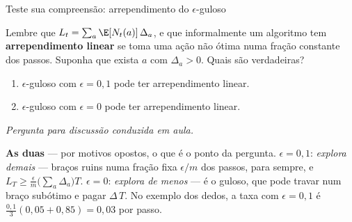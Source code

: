 \documentclass[aspectratio=169, 10pt]{beamer}
\newcommand{\paradiscussao}{\smallskip
  {\footnotesize\color{rlCinza}\itshape Pergunta para discussão conduzida em aula.}}
\newcommand{\Nc}{N}                         %
\newcommand{\gap}{\Delta}
\newcommand{\Reg}{L}
\begin{document}
\begin{frame}{Teste sua compreensão: arrependimento do $\epsilon$-guloso}
  \vspace{-2mm}
  \begin{quizbox}{}
    Lembre que $\Reg_t = \sum_{a} \E[\Nc_t(a)]\,\gap_a$, e que
    informalmente um algoritmo tem \textbf{arrependimento linear} se toma
    uma ação não ótima numa fração constante dos passos. Suponha que
    exista $a$ com $\gap_a > 0$. Quais são verdadeiras?
    \begin{enumerate}\setlength{\itemsep}{0.15ex}
      \item $\epsilon$-guloso com $\epsilon = 0{,}1$ pode ter
            arrependimento linear.
      \item $\epsilon$-guloso com $\epsilon = 0$ pode ter arrependimento
            linear.
    \end{enumerate}
    \paradiscussao
  \end{quizbox}

  \pause

  \begin{respbox}
    \textbf{As duas} --- por motivos opostos, o que é o ponto da pergunta.
    $\epsilon = 0{,}1$: \emph{explora demais} — braços ruins numa fração
    fixa $\epsilon/m$ dos passos, para sempre, e
    $\Reg_T \ge \frac{\epsilon}{m}\bigl(\sum_a \gap_a\bigr) T$.
    $\epsilon = 0$: \emph{explora de menos} — é o guloso, que pode travar
    num braço subótimo e pagar $\gap\,T$. No exemplo dos dedos, a taxa com
    $\epsilon = 0{,}1$ é $\frac{0{,}1}{3}(0{,}05 + 0{,}85) = 0{,}03$ por
    passo.
  \end{respbox}
\end{frame}
\end{document}
